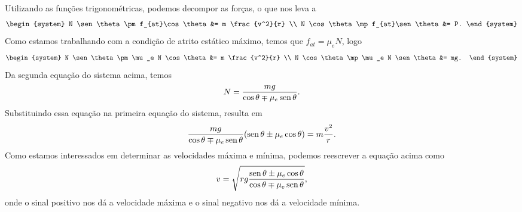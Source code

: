 Utilizando as funções trigonométricas, podemos decompor as forças, o que nos leva a
\begin{equation}
\begin{system}
    N \sen\theta \pm f_{at}\cos\theta &= m \frac{v^2}{r} \\
    N \cos\theta \mp f_{at}\sen\theta &= P.
\end{system}
\end{equation}
%
Como estamos trabalhando com a condição de atrito estático máximo, temos que $f_{at} = \mu_e N$, logo
\begin{equation}
\begin{system}
    N \sen\theta \pm \mu_e N \cos\theta &= m \frac{v^2}{r} \\
    N \cos\theta \mp \mu_e N \sen\theta &= mg.
\end{system}
\end{equation}
%
Da segunda equação do sistema acima, temos
\begin{equation}
    N = \frac{mg}{\cos\theta \mp \mu_e\operatorname{sen}\theta}.
\end{equation}
%
Substituindo essa equação na primeira equação do sistema, resulta em
\begin{equation}
    \frac{mg}{\cos\theta \mp \mu_e\operatorname{sen}\theta} (\operatorname{sen}\theta \pm \mu_e \cos\theta) = m\frac{v^2}{r}.
\end{equation}
%
Como estamos interessados em determinar as velocidades máxima e mínima, podemos reescrever a equação acima como
\begin{equation}
    v = \sqrt{rg \frac{\operatorname{sen}\theta \pm \mu_e \cos\theta}{\cos\theta \mp \mu_e\operatorname{sen}\theta}},
\end{equation}
%
onde o sinal positivo nos dá a velocidade máxima e o sinal negativo nos dá a velocidade mínima.



